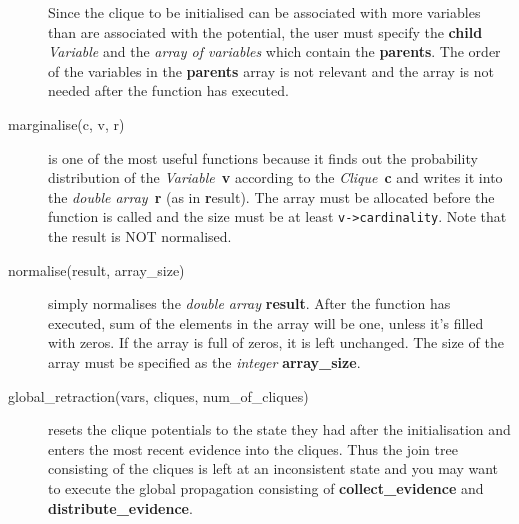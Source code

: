 \documentclass[12pt,a4paper]{report}
\begin{document}
\begin{description}
Since the clique to be initialised can be associated with more
variables than are associated with the potential, the user must
specify the \textbf{child} {\it Variable} and the {\it array of 
variables} which contain the \textbf{parents}. The order of the
variables in the \textbf{parents} array is not relevant and the 
array is not needed after the function has executed.
\item[marginalise(c, v, r)] is one of the most useful functions
because it finds out the probability distribution of the {\it
Variable}~\textbf{v} according to the {\it Clique}~\textbf{c} and
writes it into the {\it double array}~\textbf{r} (as in
\textbf{r}esult). The array must be allocated before the function is
called and the size must be at least \verb+v->cardinality+. 
Note that the result is NOT normalised.
\item[normalise(result, array\_size)] simply normalises the {\it
double array} \textbf{result}. After the function has executed, sum of
the elements in the array will be one, unless it's filled with zeros. 
If the array is full of zeros, it is left unchanged. The size of the
array must be specified as the {\it integer} \textbf{array\_size}.
\item[global\_retraction(vars, cliques, num\_of\_cliques)] resets the 
clique potentials to the state they had after the initialisation and 
enters the most recent evidence into the cliques. Thus the join tree
consisting of the cliques is left at an inconsistent state and you may
want to execute the global propagation consisting of 
\textbf{collect\_evidence} and \textbf{distribute\_evidence}. 


\end{description}
\end{document}
